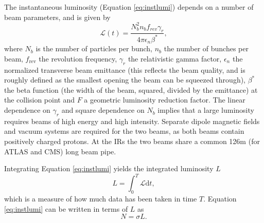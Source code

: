 The instantaneous luminosity (Equation \ref{eq:instlumi}) depends on a number of beam parameters, and is given by
\begin{equation} \label{eq:lumi_1}
    \mathcal{L}(t)=\frac{N_b^2n_bf_{rev}\gamma_r}{4\pi\epsilon_n\beta^*},
\end{equation}
where $N_b$ is the number of particles per bunch, $n_b$ the number of bunches per beam, $f_{\text{rev}}$ the revolution frequency, $\gamma_r$ the relativistic gamma factor, $\epsilon_n$ the normalized transverse beam emittance (this reflects the beam quality, and is roughly defined as the smallest opening the beam can be squeezed through), $\beta^*$ the beta function (the width of the beam, squared, divided by the emittance) at the collision point and $F$ a geometric luminosity reduction factor. The linear dependence on $\gamma_r$ and square dependence on $N_b$ implies that a large luminosity requires beams of high energy and high intensity. Separate dipole magnetic fields and vacuum systems are required for the two beams, as both beams contain positively charged protons. At the IRs the two beams share a common 126m (for ATLAS and CMS) long beam pipe.

Integrating Equation \ref{eq:instlumi} yields the integrated luminosity $L$
\begin{equation}
    L=\int_{0}^{T}\mathcal{L}\mathrm{d}t,
\end{equation}
which is a measure of how much data has been taken in time $T$. Equation \ref{eq:instlumi} can be written in terms of $L$ as
\begin{equation}
    N=\sigma L.
\end{equation}

